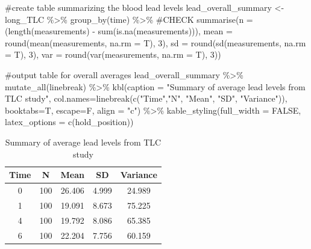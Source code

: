 \documentclass[
  letterpaper,
  DIV=11,
  numbers=noendperiod]{scrreprt}
\newenvironment{Shaded}{\begin{snugshade}}{\end{snugshade}}
\newcommand{\AttributeTok}[1]{\textcolor[rgb]{0.40,0.45,0.13}{#1}}
\newcommand{\CommentTok}[1]{\textcolor[rgb]{0.37,0.37,0.37}{#1}}
\newcommand{\ConstantTok}[1]{\textcolor[rgb]{0.56,0.35,0.01}{#1}}
\newcommand{\DecValTok}[1]{\textcolor[rgb]{0.68,0.00,0.00}{#1}}
\newcommand{\FunctionTok}[1]{\textcolor[rgb]{0.28,0.35,0.67}{#1}}
\newcommand{\NormalTok}[1]{\textcolor[rgb]{0.00,0.23,0.31}{#1}}
\newcommand{\OtherTok}[1]{\textcolor[rgb]{0.00,0.23,0.31}{#1}}
\newcommand{\SpecialCharTok}[1]{\textcolor[rgb]{0.37,0.37,0.37}{#1}}
\newcommand{\StringTok}[1]{\textcolor[rgb]{0.13,0.47,0.30}{#1}}
\begin{document}
\begin{Shaded}
\begin{Highlighting}[]
\CommentTok{\#create table summarizing the blood lead levels}
\NormalTok{lead\_overall\_summary }\OtherTok{\textless{}{-}}\NormalTok{ long\_TLC }\SpecialCharTok{\%\textgreater{}\%}
  \FunctionTok{group\_by}\NormalTok{(time) }\SpecialCharTok{\%\textgreater{}\%} \CommentTok{\#CHECK}
  \FunctionTok{summarise}\NormalTok{(}\AttributeTok{n =}\NormalTok{ (}\FunctionTok{length}\NormalTok{(measurements) }\SpecialCharTok{{-}} \FunctionTok{sum}\NormalTok{(}\FunctionTok{is.na}\NormalTok{(measurements))),}
            \AttributeTok{mean =} \FunctionTok{round}\NormalTok{(}\FunctionTok{mean}\NormalTok{(measurements, }\AttributeTok{na.rm =}\NormalTok{ T), }\DecValTok{3}\NormalTok{),}
            \AttributeTok{sd =} \FunctionTok{round}\NormalTok{(}\FunctionTok{sd}\NormalTok{(measurements, }\AttributeTok{na.rm =}\NormalTok{ T), }\DecValTok{3}\NormalTok{),}
            \AttributeTok{var =} \FunctionTok{round}\NormalTok{(}\FunctionTok{var}\NormalTok{(measurements, }\AttributeTok{na.rm =}\NormalTok{ T), }\DecValTok{3}\NormalTok{))}

\CommentTok{\#output table for overall averages}
\NormalTok{lead\_overall\_summary }\SpecialCharTok{\%\textgreater{}\%}
  \FunctionTok{mutate\_all}\NormalTok{(linebreak) }\SpecialCharTok{\%\textgreater{}\%}
  \FunctionTok{kbl}\NormalTok{(}\AttributeTok{caption =} \StringTok{"Summary of average lead levels from TLC study"}\NormalTok{,}
      \AttributeTok{col.names=}\FunctionTok{linebreak}\NormalTok{(}\FunctionTok{c}\NormalTok{(}\StringTok{"Time"}\NormalTok{,}\StringTok{"N"}\NormalTok{, }\StringTok{"Mean"}\NormalTok{, }\StringTok{"SD"}\NormalTok{, }\StringTok{"Variance"}\NormalTok{)),}
      \AttributeTok{booktabs=}\NormalTok{T, }\AttributeTok{escape=}\NormalTok{F, }\AttributeTok{align =} \StringTok{"c"}\NormalTok{) }\SpecialCharTok{\%\textgreater{}\%}
  \FunctionTok{kable\_styling}\NormalTok{(}\AttributeTok{full\_width =} \ConstantTok{FALSE}\NormalTok{, }\AttributeTok{latex\_options =} \FunctionTok{c}\NormalTok{(}\StringTok{\textquotesingle{}hold\_position\textquotesingle{}}\NormalTok{))}
\end{Highlighting}
\end{Shaded}

\begin{table}[!h]
\centering
\caption{Summary of average lead levels from TLC study}
\centering
\begin{tabular}[t]{ccccc}
\toprule
Time & N & Mean & SD & Variance\\
\midrule
0 & 100 & 26.406 & 4.999 & 24.989\\
1 & 100 & 19.091 & 8.673 & 75.225\\
4 & 100 & 19.792 & 8.086 & 65.385\\
6 & 100 & 22.204 & 7.756 & 60.159\\
\bottomrule
\end{tabular}
\end{table}
\end{document}
